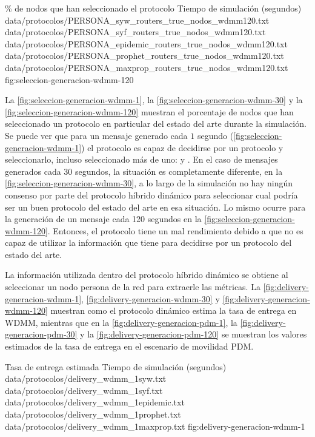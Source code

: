 {
\graficoProtocolosTiempo
{\% de nodos que han seleccionado el protocolo}
{Tiempo de simulación (segundos)}
{data/protocolos/PERSONA_syw_routers_true_nodos_wdmm120.txt}
{data/protocolos/PERSONA_syf_routers_true_nodos_wdmm120.txt}
{data/protocolos/PERSONA_epidemic_routers_true_nodos_wdmm120.txt}
{data/protocolos/PERSONA_prophet_routers_true_nodos_wdmm120.txt}
{data/protocolos/PERSONA_maxprop_routers_true_nodos_wdmm120.txt}
}{fig:seleccion-generacion-wdmm-120}



La \ref{fig:seleccion-generacion-wdmm-1}, la
\ref{fig:seleccion-generacion-wdmm-30} y la
\ref{fig:seleccion-generacion-wdmm-120} muestran el porcentaje de nodos que han
seleccionado un protocolo en particular del estado del arte durante la
simulación.  Se puede ver que para un mensaje generado cada $1$ segundo
(\ref{fig:seleccion-generacion-wdmm-1}) el protocolo es capaz de decidirse por
un protocolo y seleccionarlo, incluso seleccionado más de uno: \syf{} y \syw. En
el caso de mensajes generados cada $30$ segundos, la situación es completamente
diferente, en la \ref{fig:seleccion-generacion-wdmm-30}, a lo largo de la
simulación no hay ningún consenso por parte del protocolo híbrido dinámico para
seleccionar cual podría ser un buen protocolo del estado del arte en esa
situación. Lo mismo ocurre para la generación de un mensaje cada 120 segundos en
la \ref{fig:seleccion-generacion-wdmm-120}. Entonces, el protocolo tiene un mal
rendimiento debido a que no es capaz de utilizar la información que tiene para
decidirse por un protocolo del estado del arte.



La información utilizada dentro del protocolo híbrido dinámico se obtiene al
seleccionar un nodo persona de la red para extraerle las métricas. La
\ref{fig:delivery-generacion-wdmm-1}, \ref{fig:delivery-generacion-wdmm-30} y
\ref{fig:delivery-generacion-wdmm-120} muestran como el protocolo dinámico
estima la tasa de entrega en WDMM, mientras que en la
\ref{fig:delivery-generacion-pdm-1}, la \ref{fig:delivery-generacion-pdm-30} y
la \ref{fig:delivery-generacion-pdm-120} se muestran los valores estimados de la
tasa de entrega en el escenario de movilidad PDM.



{
\graficoEstimacio
{Tasa de entrega estimada}
{Tiempo de simulación (segundos)}
{data/protocolos/delivery_wdmm_1syw.txt}
{data/protocolos/delivery_wdmm_1syf.txt}
{data/protocolos/delivery_wdmm_1epidemic.txt}
{data/protocolos/delivery_wdmm_1prophet.txt}
{data/protocolos/delivery_wdmm_1maxprop.txt}
}{fig:delivery-generacion-wdmm-1}


